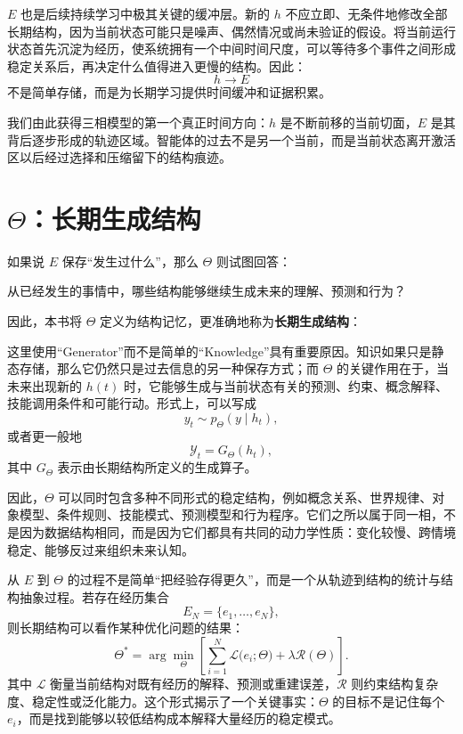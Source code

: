 $E$ 也是后续持续学习中极其关键的缓冲层。新的 $h$ 不应立即、无条件地修改全部长期结构，因为当前状态可能只是噪声、偶然情况或尚未验证的假设。将当前运行状态首先沉淀为经历，使系统拥有一个中间时间尺度，可以等待多个事件之间形成稳定关系后，再决定什么值得进入更慢的结构。因此：
\[
h\rightarrow E
\]
不是简单存储，而是为长期学习提供时间缓冲和证据积累。

我们由此获得三相模型的第一个真正时间方向：$h$ 是不断前移的当前切面，$E$ 是其背后逐步形成的轨迹区域。智能体的过去不是另一个当前，而是当前状态离开激活区以后经过选择和压缩留下的结构痕迹。

\section{$\Theta$：长期生成结构}

如果说 $E$ 保存“发生过什么”，那么 $\Theta$ 则试图回答：
\begin{statementbox}
从已经发生的事情中，哪些结构能够继续生成未来的理解、预测和行为？
\end{statementbox}
因此，本书将 $\Theta$ 定义为结构记忆，更准确地称为\textbf{长期生成结构}：
\begin{statementbox}
\centering
{}
\end{statementbox}

这里使用“Generator”而不是简单的“Knowledge”具有重要原因。知识如果只是静态存储，那么它仍然只是过去信息的另一种保存方式；而 $\Theta$ 的关键作用在于，当未来出现新的 $h(t)$ 时，它能够生成与当前状态有关的预测、约束、概念解释、技能调用条件和可能行动。形式上，可以写成
\[
y_t
\sim
p_\Theta
\left(
y
\mid
h_t
\right),
\]
或者更一般地
\[
\mathcal{Y}_t
=
G_\Theta(h_t),
\]
其中 $G_\Theta$ 表示由长期结构所定义的生成算子。

因此，$\Theta$ 可以同时包含多种不同形式的稳定结构，例如概念关系、世界规律、对象模型、条件规则、技能模式、预测模型和行为程序。它们之所以属于同一相，不是因为数据结构相同，而是因为它们都具有共同的动力学性质：变化较慢、跨情境稳定、能够反过来组织未来认知。

从 $E$ 到 $\Theta$ 的过程不是简单“把经验存得更久”，而是一个从轨迹到结构的统计与结构抽象过程。若存在经历集合
\[
E_N
=
\{e_1,\ldots,e_N\},
\]
则长期结构可以看作某种优化问题的结果：
\[
\Theta^\ast
=
\arg\min_{\Theta}
\left[
\sum_{i=1}^{N}
\mathcal{L}
\bigl(
e_i;
\Theta
\bigr)
+
\lambda
\mathcal{R}(\Theta)
\right].
\]
其中 $\mathcal{L}$ 衡量当前结构对既有经历的解释、预测或重建误差，$\mathcal{R}$ 则约束结构复杂度、稳定性或泛化能力。这个形式揭示了一个关键事实：$\Theta$ 的目标不是记住每个 $e_i$，而是找到能够以较低结构成本解释大量经历的稳定模式。

